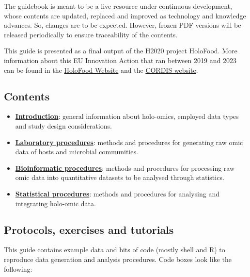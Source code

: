 \documentclass[
]{book}
\providecommand{\tightlist}{%
  \setlength{\itemsep}{0pt}\setlength{\parskip}{0pt}}
\begin{document}
The guidebook is meant to be a live resource under continuous development, whose contents are updated, replaced and improved as technology and knowledge advances. So, changes are to be expected. However, frozen PDF versions will be released periodically to ensure traceability of the contents.

This guide is presented as a final output of the H2020 project HoloFood. More information about this EU Innovation Action that ran between 2019 and 2023 can be found in the \href{http://www.holofood.eu}{HoloFood Website} and the \href{https://cordis.europa.eu/project/id/817729}{CORDIS website}.

\hypertarget{contents}{%
\subsection*{Contents}\label{contents}}

\begin{itemize}
\tightlist
\item
  \textbf{\protect\hyperlink{holo-omics}{Introduction}}: general information about holo-omics, employed data types and study design considerations.
\item
  \textbf{\protect\hyperlink{about-labwork}{Laboratory procedures}}: methods and procedures for generating raw omic data of hosts and microbial communities.
\item
  \textbf{\protect\hyperlink{about-bioinformatics}{Bioinformatic procedures}}: methods and procedures for processing raw omic data into quantitative datasets to be analysed through statistics.
\item
  \textbf{\protect\hyperlink{about-statistics}{Statistical procedures}}: methods and procedures for analysing and integrating holo-omic data.
\end{itemize}

\hypertarget{protocols-exercises-tutorials}{%
\subsection*{Protocols, exercises and tutorials}\label{protocols-exercises-tutorials}}

This guide contains example data and bits of code (mostly shell and R) to reproduce data generation and analysis procedures. Code boxes look like the following:

\small
\end{document}
